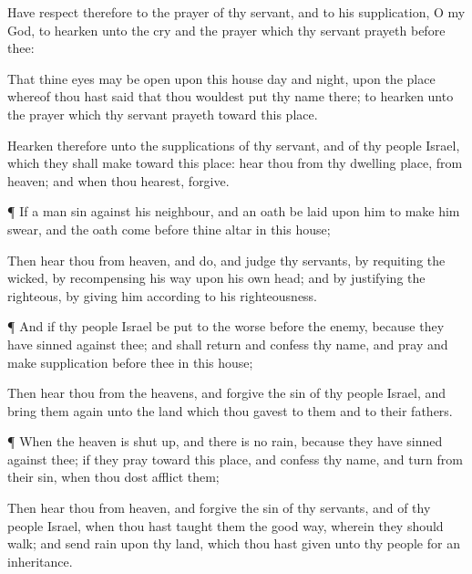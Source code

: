 {Have
respect therefore to the
prayer of thy
servant, and to his
supplication, O
{} my
God, to
hearken unto the
cry and the
prayer which thy
servant
prayeth
before thee:

That thine
eyes may be
open upon this
house
day and
night, upon the
place whereof thou hast
said that thou wouldest
put thy
name there; to
hearken unto the
prayer which thy
servant
prayeth toward this
place.

Hearken therefore unto the
supplications of thy
servant, and of thy
people
Israel, which they shall
make toward this
place:
hear thou from thy
dwelling
place,
{} from
heaven; and when thou
hearest,
forgive.


\par }{\PP {}¶ If a
man
sin against his
neighbour, and an
oath be
laid upon him to make him
swear, and the
oath
come
before thine
altar in this
house;

Then
hear thou from
heaven, and
do, and
judge thy
servants, by
requiting the
wicked, by
recompensing his
way upon his own
head; and by
justifying the
righteous, by
giving him according to his
righteousness.


\par }{\PP {}¶ And if thy
people
Israel be put to the
worse
before the
enemy, because they have
sinned against thee; and shall
return and
confess thy
name, and
pray and make
supplication
before thee in this
house;

Then
hear thou from the
heavens, and
forgive the
sin of thy
people
Israel, and bring them
again unto the
land which thou
gavest to them and to their
fathers.


\par }{\PP {}¶ When the
heaven is shut
up, and there is no
rain, because they have
sinned against thee;
{} if they
pray toward this
place, and
confess thy
name, and
turn from their
sin, when thou dost
afflict them;

Then
hear thou from
heaven, and
forgive the
sin of thy
servants, and of thy
people
Israel, when thou hast
taught them the
good
way, wherein they should
walk; and
send
rain upon thy
land, which thou hast
given unto thy
people for an
inheritance.


}
